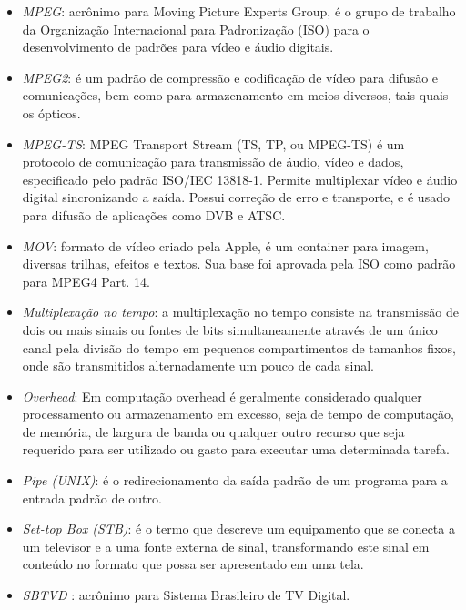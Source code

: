 \begin{itemize}
  \item \emph{MPEG}: acrônimo para {M}oving {P}icture {E}xperts {G}roup, é o grupo de trabalho da Organização Internacional para Padronização (ISO) para o desenvolvimento de padrões para vídeo e áudio digitais.

  \item \emph{MPEG2}: é um padrão de compressão e codificação de vídeo para difusão e comunicações, bem como para armazenamento em meios diversos, tais quais os ópticos.

  \item \emph{MPEG-TS}: MPEG {T}ransport {S}tream (TS, TP, ou MPEG-TS) é um protocolo de  comunicação para transmissão de áudio, vídeo e dados, especificado pelo padrão  ISO/IEC 13818-1. Permite multiplexar vídeo e áudio digital sincronizando a saída. Possui correção de erro e transporte, e é usado para difusão de aplicações como DVB e ATSC.

  \item \emph{MOV}: formato de vídeo criado pela Apple, é um container para imagem, diversas trilhas, efeitos e textos. Sua base foi aprovada pela ISO como padrão para MPEG4 Part. 14.

  \item \emph{Multiplexação no tempo}: a multiplexação no tempo consiste na transmissão de dois ou mais sinais ou fontes de bits simultaneamente através de um único canal pela divisão do tempo em pequenos compartimentos de tamanhos fixos, onde são transmitidos alternadamente um pouco de cada sinal.

  \item \emph{Overhead}: Em computação overhead é geralmente considerado qualquer processamento ou armazenamento em excesso, seja de tempo de computação, de memória, de largura de banda ou qualquer outro recurso que seja requerido para ser utilizado ou gasto para executar uma determinada tarefa.

  \item \emph{Pipe (UNIX)}: é o redirecionamento da saída padrão de um programa para a entrada padrão de outro.

  \item \emph{{S}et-{t}op {B}ox ({STB})}: é o termo que descreve um equipamento que se conecta a um televisor e a uma fonte externa de sinal, transformando este sinal em conteúdo no formato que possa ser apresentado em uma tela.

  \item \emph{SBTVD} \cite{sbtvd}: acrônimo para {S}istema {B}rasileiro de {TV} {D}igital.


\end{itemize}
